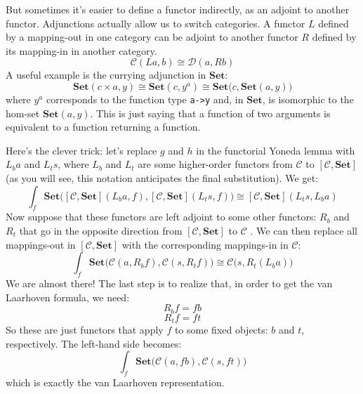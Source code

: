 \documentclass[11pt]{amsart}
\newcommand{\hask}[1]{\texttt{#1}}
\begin{document}
But sometimes it's easier to define a functor indirectly, as an adjoint to another functor. Adjunctions actually allow us to switch categories. A functor $L$ defined by a mapping-out in one category can be adjoint to another functor $R$ defined by its mapping-in in another category.
\[ \mathcal{C}(L a, b) \cong \mathcal{D}(a, R b) \]
A useful example is the currying adjunction in $\mathbf{Set}$:
\[\mathbf{Set}(c \times a, y) \cong \mathbf{Set}(c, y^a) \cong  \mathbf{Set}\big(c, \mathbf{Set}(a, y)\big) \]
where $y^a$ corresponds to the function type \hask{a->y} and, in $\mathbf{Set}$, is isomorphic to the hom-set $\mathbf{Set}(a, y)$. This is just saying that a function of two arguments is equivalent to a function returning a function.

Here's the clever trick: let's replace $g$ and $h$ in the functorial Yoneda lemma with $L_b a$ and $L_t s$, where $L_b$ and $L_t$ are some higher-order functors from $\mathcal{C}$ to $[\mathcal{C},\mathbf{Set}]$ (as you will see, this notation anticipates the final substitution). We get:
\[ \int_f \mathbf{Set}\big( [\mathcal{C},\mathbf{Set}](L_b a, f),  [\mathcal{C},\mathbf{Set}](L_t s, f)\big) \cong  [\mathcal{C},\mathbf{Set}](L_t s, L_b a) \]
Now suppose that these functors are left adjoint to some other functors: $R_b$ and $R_t$ that go in the opposite direction from $[\mathcal{C},\mathbf{Set}]$ to $\mathcal{C}$ . We can then replace all mappings-out in $ [\mathcal{C},\mathbf{Set}]$ with the corresponding mappings-in in $\mathcal{C}$:
\[ \int_f \mathbf{Set}\big( \mathcal{C}(a, R_b f),  \mathcal{C}(s, R_t f)\big) \cong \mathcal{C}\big(s, R_t (L_b a)\big) \]
We are almost there! The last step is to realize that, in order to get the van Laarhoven formula, we need:
\[R_b f = f b\]
\[R_t f = f t \]
 So these are just functors that apply $f$ to some fixed objects: $b$ and $t$, respectively. The left-hand side becomes:
\[ \int_f \mathbf{Set}\big( \mathcal{C}(a, f b), \mathcal{C}(s, f t) \big) \]
which is exactly the van Laarhoven representation. 
\end{document}
